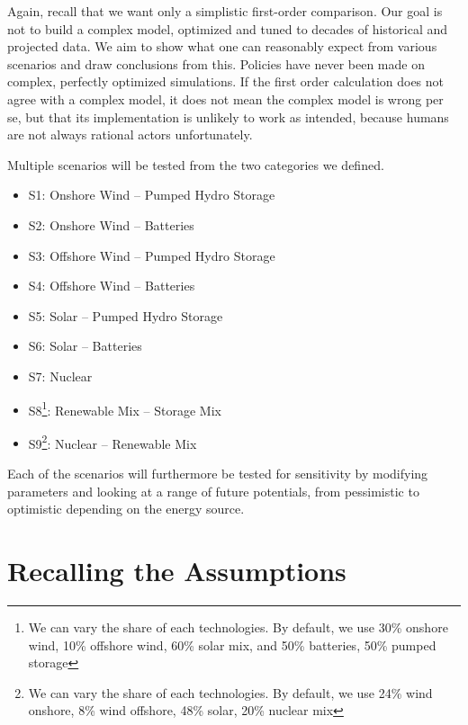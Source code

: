Again, recall that we want only a simplistic first-order comparison. Our goal is not to build a complex model, optimized and tuned to decades of historical and projected data. We aim to show what one can reasonably expect from various scenarios and draw conclusions from this. Policies have never been made on complex, perfectly optimized simulations. If the first order calculation does not agree with a complex model, it does not mean the complex model is wrong per se, but that its implementation is unlikely to work as intended, because humans are not always rational actors unfortunately.

Multiple scenarios will be tested from the two categories we defined.


\begin{kaobox}[frametitle=Scenarios to consider]

\begin{itemize}
	\item S1: Onshore Wind -- Pumped Hydro Storage
	\item S2: Onshore Wind -- Batteries
	\item S3: Offshore Wind -- Pumped Hydro Storage
	\item S4: Offshore Wind -- Batteries
	\item S5: Solar -- Pumped Hydro Storage
	\item S6: Solar -- Batteries
	\item S7: Nuclear
	\item S8\footnote{We can vary the share of each technologies. By default, we use 30\% onshore wind, 10\% offshore wind,  60\% solar mix, and 50\% batteries, 50\% pumped storage}: Renewable Mix -- Storage Mix
	\item S9\footnote{We can vary the share of each technologies. By default, we use 24\% wind onshore, 8\% wind offshore, 48\% solar, 20\% nuclear mix}: Nuclear -- Renewable Mix
\end{itemize}

Each of the scenarios will furthermore be tested for sensitivity by modifying parameters and looking at a range of future potentials, from pessimistic to optimistic depending on the energy source.

\end{kaobox}

\section{Recalling the Assumptions}

